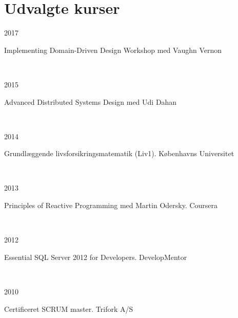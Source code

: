 \documentclass[10pt, a4paper]{article}
\begin{document}
\section{Udvalgte kurser}
\begin{Row}%
  \begin{Cell}{1}
    2017
  \end{Cell}
  \begin{Cell}{3}
    Implementing Domain-Driven Design Workshop med Vaughn Vernon
  \end{Cell}
\end{Row}
\\[0.5cm]\begin{Row}%
  \begin{Cell}{1}
    2015
  \end{Cell}
  \begin{Cell}{3}
    Advanced Distributed Systems Design med Udi Dahan
  \end{Cell}
\end{Row}
\\[0.5cm]
\begin{Row}%
  \begin{Cell}{1}
    2014
  \end{Cell}
  \begin{Cell}{3}
    Grundlæggende livsforsikringsmatematik (Liv1). Københavns Universitet
  \end{Cell}
\end{Row}
\\[0.5cm]
\begin{Row}%
  \begin{Cell}{1}
    2013
  \end{Cell}
  \begin{Cell}{3}
    Principles of Reactive Programming med Martin Odersky. Coursera
  \end{Cell}
\end{Row}
\\[0.5cm]
\begin{Row}%
  \begin{Cell}{1}
    2012
  \end{Cell}
  \begin{Cell}{3}
    Essential SQL Server 2012 for Developers. DevelopMentor
  \end{Cell}
\end{Row}
\\[0.5cm]
\begin{Row}%
  \begin{Cell}{1}
    2010
  \end{Cell}
  \begin{Cell}{3}
    Certificeret SCRUM master. Trifork A/S
  \end{Cell}
\end{Row}
\end{document}
